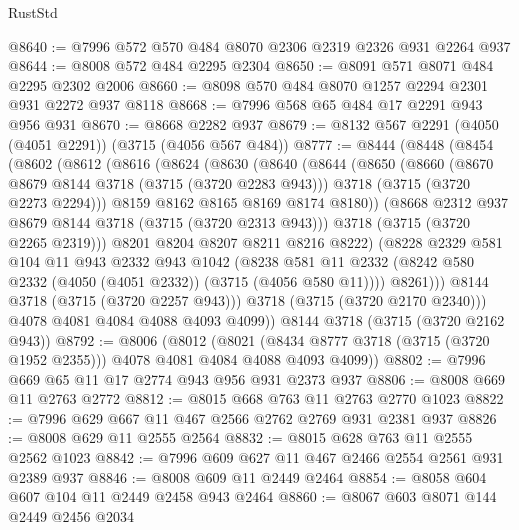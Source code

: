 \begin{lexlean}{RustStd}
\begin{coremodule}
@8640 := @7996 @572 @570 @484 @8070 @2306 @2319 @2326 @931 @2264 @937
@8644 := @8008 @572 @484 @2295 @2304
@8650 := @8091 @571 @8071 @484 @2295 @2302 @2006
@8660 := @8098 @570 @484 @8070 @1257 @2294 @2301 @931 @2272 @937 @8118
@8668 := @7996 @568 @65 @484 @17 @2291 @943 @956 @931
@8670 := @8668 @2282 @937
@8679 := @8132 @567 @2291 (@4050 (@4051 @2291)) (@3715 (@4056 @567 @484))
@8777 := @8444
    (@8448
      (@8454
        (@8602
          (@8612
            (@8616
              (@8624
                (@8630
                  (@8640
                    (@8644
                      (@8650
                        (@8660
                          (@8670 @8679 @8144 @3718 (@3715 (@3720 @2283 @943)))
                          @3718
                          (@3715 (@3720 @2273 @2294)))
                        @8159
                        @8162
                        @8165
                        @8169
                        @8174
                        @8180))
                    (@8668 @2312 @937 @8679 @8144 @3718 (@3715 (@3720 @2313 @943)))
                    @3718
                    (@3715 (@3720 @2265 @2319)))
                  @8201
                  @8204
                  @8207
                  @8211
                  @8216
                  @8222)
                (@8228
                  @2329
                  @581
                  @104
                  @11
                  @943
                  @2332
                  @943
                  @1042
                  (@8238
                    @581
                    @11
                    @2332
                    (@8242 @580 @2332 (@4050 (@4051 @2332)) (@3715 (@4056 @580 @11))))
                  @8261)))
            @8144
            @3718
            (@3715 (@3720 @2257 @943)))
          @3718
          (@3715 (@3720 @2170 @2340)))
        @4078
        @4081
        @4084
        @4088
        @4093
        @4099))
    @8144
    @3718
    (@3715 (@3720 @2162 @943))
@8792 := @8006
    (@8012
      (@8021 (@8434 @8777 @3718 (@3715 (@3720 @1952 @2355))) @4078 @4081 @4084 @4088 @4093 @4099))
@8802 := @7996 @669 @65 @11 @17 @2774 @943 @956 @931 @2373 @937
@8806 := @8008 @669 @11 @2763 @2772
@8812 := @8015 @668 @763 @11 @2763 @2770 @1023
@8822 := @7996 @629 @667 @11 @467 @2566 @2762 @2769 @931 @2381 @937
@8826 := @8008 @629 @11 @2555 @2564
@8832 := @8015 @628 @763 @11 @2555 @2562 @1023
@8842 := @7996 @609 @627 @11 @467 @2466 @2554 @2561 @931 @2389 @937
@8846 := @8008 @609 @11 @2449 @2464
@8854 := @8058 @604 @607 @104 @11 @2449 @2458 @943 @2464
@8860 := @8067 @603 @8071 @144 @2449 @2456 @2034

\end{coremodule}
\end{lexlean}
